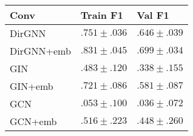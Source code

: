 \begin{tabular}{lll}
\toprule
Conv & Train \textbf{F1} & Val \textbf{F1} \\
\midrule
DirGNN & $.751\scriptstyle \pm .036$ & $.646\scriptstyle \pm .039$ \\
DirGNN+emb & $\mathbf{.831\scriptstyle \pm .045}$ & $\mathbf{.699\scriptstyle \pm .034}$ \\
GIN & $.483\scriptstyle \pm .120$ & $.338\scriptstyle \pm .155$ \\
GIN+emb & $.721\scriptstyle \pm .086$ & $.581\scriptstyle \pm .087$ \\
GCN & $.053\scriptstyle \pm .100$ & $.036\scriptstyle \pm .072$ \\
GCN+emb & $.516\scriptstyle \pm .223$ & $.448\scriptstyle \pm .260$ \\
\bottomrule
\end{tabular}
